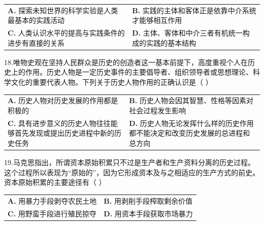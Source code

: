 \documentclass[UTF8,11pt]{ctexart}
\begin{document}
\begin{center}\begin{tabular}{>{\raggedright\arraybackslash}p{\dimexpr(\linewidth-4\tabcolsep)/2\relax}>{\raggedright\arraybackslash}p{\dimexpr(\linewidth-4\tabcolsep)/2\relax}}
\textbf{A.} 探索未知世界的科学实验是人类最基本的实践活动 & \textbf{B.} 实践的主体和客体正是依靠中介系统才能够相互作用\\[.35em]
\textbf{C.} 人类认识水平的提高与实践条件的进步有直接的关系 & \textbf{D.} 主体、客体和中介三者有机统一构成的实践的基本结构\\[.35em]\end{tabular}\end{center}

18.唯物史观在坚持人民群众是历史的创造者这一基本前提下，高度重视个人在历史上的作用。历史人物是一定历史事件的主要倡导者、组织领导者或思想理论、科学文化的重要代表人物。下列关于历史人物作用的正确认识是（     ）


\begin{center}\begin{tabular}{>{\raggedright\arraybackslash}p{\dimexpr(\linewidth-4\tabcolsep)/2\relax}>{\raggedright\arraybackslash}p{\dimexpr(\linewidth-4\tabcolsep)/2\relax}}
\textbf{A.} 历史人物对历史发展的作用都是积极的 & \textbf{B.} 历史人物会因其智慧、性格等因素对社会过程发生影响\\[.35em]
\textbf{C.} 具有进步意义的历史人物往往能够首先发现或提出历史进程中新的历史任务 & \textbf{D.} 历史人物无论发挥什么样的历史作用都不能决定和改变历史发展的总进程和总方向\\[.35em]\end{tabular}\end{center}

19.马克思指出，所谓资本原始积累只不过是生产者和生产资料分离的历史过程。这个过程所以表现为“原始的”，因为它形成资本及与之相适应的生产方式的前史。资本原始积累的主要途径有（     ）


\begin{center}\begin{tabular}{>{\raggedright\arraybackslash}p{\dimexpr(\linewidth-4\tabcolsep)/2\relax}>{\raggedright\arraybackslash}p{\dimexpr(\linewidth-4\tabcolsep)/2\relax}}
\textbf{A.} 用暴力手段剥夺农民土地 & \textbf{B.} 用剥削手段榨取剩余价值\\[.35em]
\textbf{C.} 用野蛮手段进行殖民掠夺 & \textbf{D.} 用资本手段获取市场暴力\\[.35em]\end{tabular}\end{center}
\end{document}
